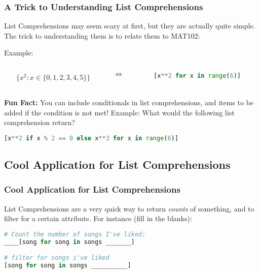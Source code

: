 \documentclass[hyperref={colorlinks,citecolor=blue,linkcolor=blue,urlcolor=blue}]{beamer}
\begin{document}
\begin{frame}[fragile]
  \frametitle{A Trick to Understanding List Comprehensions}
    List Comprehensions may seem scary at first, but they are actually quite simple. The trick to understanding them is to relate them to MAT102:

  Example:
  
  \begin{columns}[T]
    \begin{column}{0.4\textwidth}
    \begin{align*}
        \{x^2 : x \in \{0, 1, 2, 3, 4, 5\}\}
    \end{align*}
    \end{column}
    \hfill
    \begin{column}{0.1\textwidth}
    \begin{center}
    \Large $\iff$
    \end{center}
    \end{column}
    \hfill
    \begin{column}{0.5\textwidth}
    \begin{lstlisting}[language=Python, style=mystyle]
[x**2 for x in range(6)]
    \end{lstlisting}
    \end{column}
    \end{columns}


    \textbf{Fun Fact:} You can include conditionals in list comprehensions, and items to be added if the condition is not met! Example: What would the following list comprehension return?
    \begin{lstlisting}[language=Python, style=mystyle]
[x**2 if x % 2 == 0 else x**3 for x in range(6)]
    \end{lstlisting}
\end{frame}

\subsection{Cool Application for List Comprehensions}
\begin{frame}[fragile]
  \frametitle{Cool Application for List Comprehensions}
  List Comprehensions are a very quick way to return \textit{counts} of something, and to filter for a certain attribute. For instance (fill in the blanks):
  \begin{lstlisting}[language=Python, style=mystyle]
# Count the number of songs I've liked:
____[song for song in songs _______]

# filter for songs i've liked
[song for song in songs __________]
  \end{lstlisting}
  \end{frame}
\end{document}

